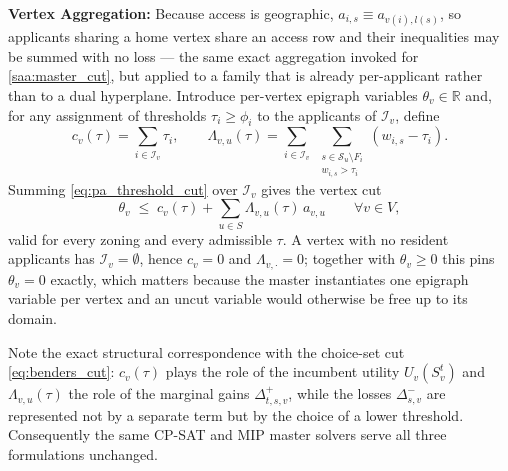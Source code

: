 \documentclass{article}
\begin{document}
\noindent\textbf{Vertex Aggregation:}
Because access is geographic, $a_{i,s} \equiv a_{v(i), l(s)}$, so applicants sharing a home vertex share an access row and their inequalities may be summed with no loss --- the same exact aggregation invoked for \eqref{saa:master_cut}, but applied to a family that is already per-applicant rather than to a dual hyperplane. Introduce per-vertex epigraph variables $\theta_v \in \mathbb{R}$ and, for any assignment of thresholds $\tau_i \geq \phi_i$ to the applicants of $\mathcal{I}_v$, define
\begin{equation}\label{eq:pa_vertex_coeff}
c_v(\tau) = \sum_{i \in \mathcal{I}_v} \tau_i,
\qquad
\Lambda_{v, u}(\tau) = \sum_{i \in \mathcal{I}_v} \ \sum_{\substack{s \in \mathcal{S}_u \setminus F_i \\ w_{i,s} > \tau_i}} (w_{i,s} - \tau_i).
\end{equation}
Summing \eqref{eq:pa_threshold_cut} over $\mathcal{I}_v$ gives the vertex cut
\begin{equation}\label{eq:pa_vertex_cut}
\theta_v \;\leq\; c_v(\tau) + \sum_{u \in S} \Lambda_{v, u}(\tau)\, a_{v, u} \qquad \forall v \in V,
\end{equation}
valid for every zoning and every admissible $\tau$. A vertex with no resident applicants has $\mathcal{I}_v = \emptyset$, hence $c_v = 0$ and $\Lambda_{v, \cdot} = 0$; together with $\theta_v \geq 0$ this pins $\theta_v = 0$ exactly, which matters because the master instantiates one epigraph variable per vertex and an uncut variable would otherwise be free up to its domain.

Note the exact structural correspondence with the choice-set cut \eqref{eq:benders_cut}: $c_v(\tau)$ plays the role of the incumbent utility $U_v(S_v^t)$ and $\Lambda_{v,u}(\tau)$ the role of the marginal gains $\Delta^+_{t,s,v}$, while the losses $\Delta^-_{s,v}$ are represented not by a separate term but by the choice of a lower threshold. Consequently the same CP-SAT and MIP master solvers serve all three formulations unchanged.
\end{document}
